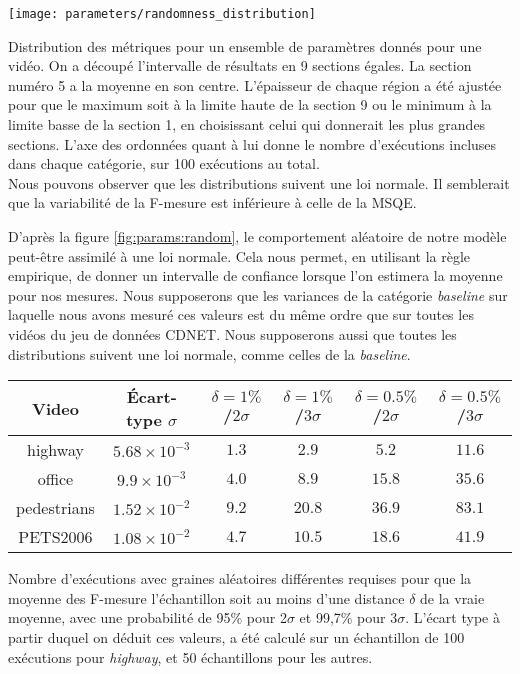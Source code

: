 	\begin{figureth}
		\texttt{[image: parameters/randomness\_distribution]}
		\caption[Effet de l'aléatoire sur les métriques]{Distribution des métriques pour un ensemble de paramètres donnés pour une vidéo. On a découpé l'intervalle de résultats en 9 sections égales. La section numéro 5 a la moyenne en son centre. L'épaisseur de chaque région a été ajustée pour que le maximum soit à la limite haute de la section 9 ou le minimum à la limite basse de la section 1, en choisissant celui qui donnerait les plus grandes sections. L'axe des ordonnées quant à lui donne le nombre d'exécutions incluses dans chaque catégorie, sur 100 exécutions au total.\\
		
		Nous pouvons observer que les distributions suivent une loi normale. Il semblerait que la variabilité de la F-mesure est inférieure à celle de la MSQE.}\label{fig:params:random}
	\end{figureth}

	D'après la figure \ref{fig:params:random}, le comportement aléatoire de notre modèle peut-être assimilé à une loi normale. Cela nous permet, en utilisant la règle empirique, de donner un intervalle de confiance lorsque l'on estimera la moyenne pour nos mesures. Nous supposerons que les variances de la catégorie \textit{baseline} sur laquelle nous avons mesuré ces valeurs est du même ordre que sur toutes les vidéos du jeu de données CDNET. Nous supposerons aussi que toutes les distributions suivent une loi normale, comme celles de la \textit{baseline}.

	\begin{tableth}
	\begin{tabular}{|c|c|cccc|}
		\hline
		Video	& Écart-type $\sigma$& $\delta=1\%$ /$2\sigma$ & $\delta=1\%$ /$3\sigma$ & $\delta=0.5\%$ /$2\sigma$ & $\delta=0.5\%$ /$3\sigma$\\
		\hline
		highway & $5.68 \times 10^{-3}$ & $1.3$ & $2.9$ & $5.2$ & $11.6$\\
		office & $9.9 \times 10^{-3}$ & $4.0$ & $8.9$ & $15.8$ & $35.6$\\
		pedestrians & $1.52 \times 10^{-2}$ & $9.2$ & $20.8$ & $36.9$ & $83.1$\\
		PETS2006 & $1.08 \times 10^{-2}$ & $4.7$ & $10.5$ & $18.6$ & $41.9$\\
		\hline
	\end{tabular}
	\caption[Estimations statistiques du nombre de graines requises]{Nombre d'exécutions avec graines aléatoires différentes requises pour que la moyenne des F-mesure l'échantillon soit au moins d'une distance $\delta$ de la vraie moyenne, avec une probabilité de 95\% pour 2$\sigma$ et 99,7\% pour 3$\sigma$. L'écart type à partir duquel on déduit ces valeurs, a été calculé sur un échantillon de 100 exécutions pour \textit{highway}, et 50 échantillons pour les autres.} \label{tab:nb_seed_stats}
	\end{tableth}

